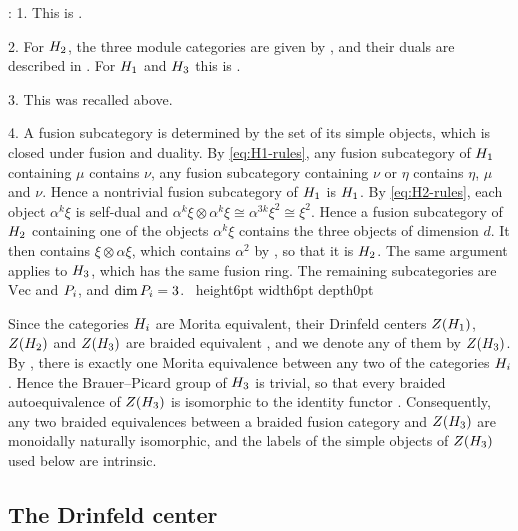 \documentclass[leqno]{article}
\let\cal\relax
\newcommand{\cal}{\mathcal}
\newcommand{\qed}{\hfill \vrule height6pt  width6pt depth0pt}
\newcommand{\ot}{\otimes}
\newenvironment{proof}[1][]{\noindent {\it Proof #1} : }{\hbox{~}\qed
\smallskip
}
\numberwithin{equation}{section}
\begin{document}
\begin{proof}
1. This is \cite[Theorem 1.4 p.~4 and Corollary 3.22 p.~24]{GrS12}.

2. For $\cal H_2$, the three module categories are given by \cite[Corollary 3.16 p.~22]{GrS12}, and their duals are described in \cite[Lemmas 3.17 and 3.18 p.~22, Definition 3.19 p.~23 and Corollary 3.22 p.~24]{GrS12}. For $\cal H_1$ and $\cal H_3$ this is \cite[Theorem 3.25 p.~24]{GrS12}.

3. This was recalled above.

4. A fusion subcategory is determined by the set of its simple objects, which is closed under fusion and duality. By \eqref{eq:H1-rules}, any fusion subcategory of $\cal H_1$ containing $\mu$ contains $\nu$, any fusion subcategory containing $\nu$ or $\eta$ contains $\eta$, $\mu$ and $\nu$. Hence a nontrivial fusion subcategory of $\cal H_1$ is $\cal H_1$. By \eqref{eq:H2-rules}, each object $\alpha^k\xi$ is self-dual and $\alpha^k\xi \ot \alpha^k\xi \cong \alpha^{3k}\xi^2 \cong \xi^2$. Hence a fusion subcategory of $\cal H_2$ containing one of the objects $\alpha^k\xi$ contains the three objects of dimension $d$. It then contains $\xi \ot \alpha\xi$, which contains $\alpha^2$ by \cite[Table 1 p.~15]{GrS12}, so that it is $\cal H_2$. The same argument applies to $\cal H_3$, which has the same fusion ring. The remaining subcategories are $\mathrm{Vec}$ and $\cal P_i$, and $\dim \cal P_i = 3$.
\end{proof}

Since the categories $\cal H_i$ are Morita equivalent, their Drinfeld centers $Z(\cal H_1)$, $Z(\cal H_2)$ and $Z(\cal H_3)$ are braided equivalent \cite[Theorem 3.1 p.~9]{ENO11}, and we denote any of them by $Z(\cal H_3)$. By \cite[Theorem 1.5 p.~5]{GrS12}, there is exactly one Morita equivalence between any two of the categories $\cal H_i$. Hence the Brauer--Picard group of $\cal H_3$ is trivial, so that every braided autoequivalence of $Z(\cal H_3)$ is isomorphic to the identity functor \cite[Theorem 1.1 p.~3]{ENO10}. Consequently, any two braided equivalences between a braided fusion category and $Z(\cal H_3)$ are monoidally naturally isomorphic, and the labels of the simple objects of $Z(\cal H_3)$ used below are intrinsic.

\subsection{The Drinfeld center}
\label{subsec:center}
\end{document}
